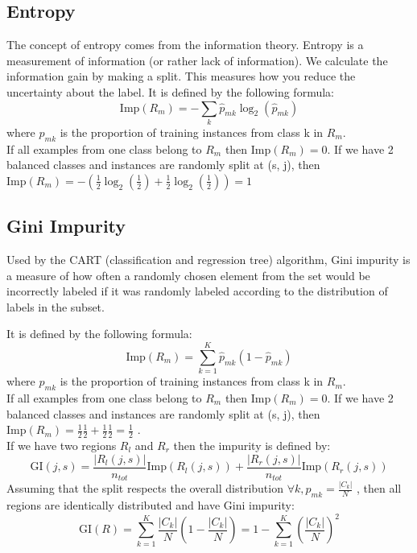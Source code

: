 \documentclass[a4paper,12pt]{article}
\begin{document}
\subsection{Entropy}

The concept of entropy comes from the information theory. Entropy is a measurement of information (or rather lack of information). We calculate the information gain by making a split. This measures how you reduce the uncertainty about the label. It is defined by the following formula:
\[
\textrm{Imp}(R_m)= -  \sum_{k}\hat{p}_{mk} \log_{2}(\hat{p}_{mk})
\]
where \( \hat{p}_{mk} \) is the proportion of training instances from class k in \(R_m\). \\

If all examples from one class belong to \(R_m\) then \( \textrm{Imp}(R_m) = 0 \). If we have 2 balanced classes and instances are randomly split at (s, j), then \( \textrm{Imp}(R_m)= - (\frac{1}{2}\log_{2}(\frac{1}{2})+ \frac{1}{2}\log_{2}(\frac{1}{2}))= 1 \)

\subsection{Gini Impurity}

Used by the CART (classification and regression tree) algorithm, Gini impurity is a measure of how often a randomly chosen element from the set would be incorrectly labeled if it was randomly labeled according to the distribution of labels in the subset. 

It is defined by the following formula:
\[
\textrm{Imp}(R_m)=  \sum_{k=1}^{K}\hat{p}_{mk}(1-\hat{p}_{mk})
\]
where \( \hat{p}_{mk} \) is the proportion of training instances from class k in \(R_m\). \\

If all examples from one class belong to \(R_m\) then \( \textrm{Imp}(R_m) = 0 \). If we have 2 balanced classes and instances are randomly split at (s, j), then \( \textrm{Imp}(R_m)= \frac{1}{2}\frac{1}{2}+ \frac{1}{2}\frac{1}{2}= \frac{1}{2} \) . \\

If we have two regions \( R_l \) and \( R_r \) then the impurity is defined by:
\[
\textrm{GI}(j,s)= \frac{\left | R_l(j,s) \right |}{n_{tot}}  \textrm{Imp}(R_l(j,s)) + \frac{\left | R_r(j,s) \right |}{n_{tot}}  \textrm{Imp}(R_r(j,s))
\]
Assuming that the split respects the overall distribution \( \forall k ,p_{mk}=\frac{\left | C_k \right |}{N} \) , then all regions are identically distributed and have Gini impurity:
\[
\textrm{GI}(R)= \sum_{k=1}^{K} \frac{\left | C_k \right |}{N}  (1-\frac{\left | C_k \right |}{N} ) = 1 - \sum_{k=1}^{K} (\frac{\left | C_k \right |}{N})^{2} \]
\end{document}
